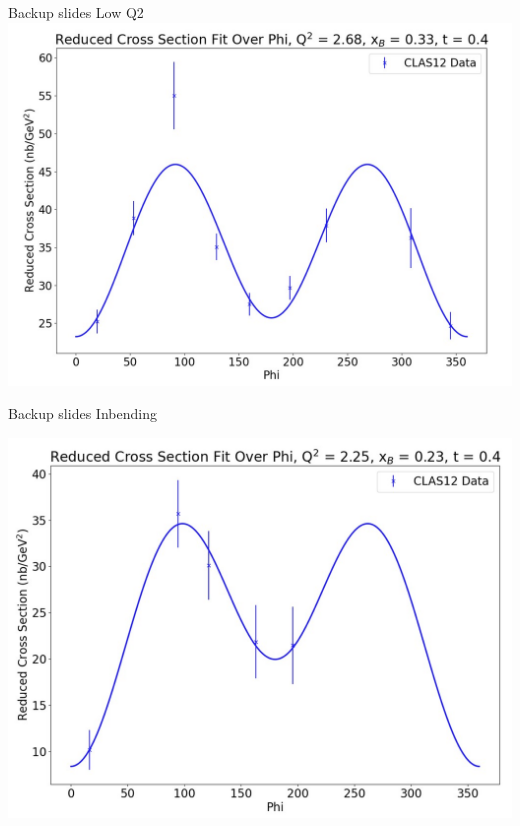 \documentclass[aspectratio=169]{beamer}
\begin{document}
\begin{frame}{Backup slides}
\centering
Low Q2\\

    \includegraphics[scale=0.2832]{DNP/beauty_2.jpg}\\
\end{frame}

\begin{frame}{Backup slides}
\centering
Inbending

    \includegraphics[scale=0.2832]{DNP/nice_inbending.jpg}\\
\end{frame}
\end{document}
